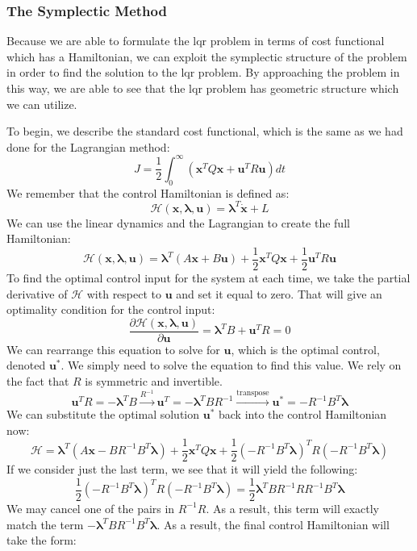 \subsubsection{The Symplectic Method}
Because we are able to formulate the \gls{lqr} problem in terms of cost functional which has a \gls{Hamiltonian}, we can exploit the symplectic structure of the problem in order to find the solution to the \gls{lqr} problem. By approaching the problem in this way, we are able to see that the \gls{lqr} problem has geometric structure which we can utilize. 

To begin, we describe the standard cost functional, which is the same as we had done for the \gls{Lagrangian} method:
$$J=\frac{1}{2}\int_{0}^\infty(\bm{x}^TQ\bm{x}+\bm{u}^TR\bm{u})dt$$
We remember that the control \gls{Hamiltonian} is defined as:
$$\mathcal{H}(\bm{x},\bm{\lambda},\bm{u})=\bm{\lambda}^T\bm{\dot{x}}+L$$
We can use the linear dynamics and the \gls{Lagrangian} to create the full \gls{Hamiltonian}:
$$\mathcal{H}(\bm{x},\bm{\lambda},\bm{u})=\bm{\lambda}^T(A\bm{x}+B\bm{u})+\frac{1}{2}\bm{x}^TQ\bm{x}+\frac{1}{2}\bm{u}^TR\bm{u}$$
To find the optimal control input for the system at each time, we take the partial derivative of $\mathcal{H}$ with respect to $\bm{u}$ and set it equal to zero. That will give an optimality condition for the control input:
$$\frac{\partial \mathcal{H}(\bm{x},\bm{\lambda},\bm{u})}{\partial \bm{u}}=\bm{\lambda}^TB+\bm{u}^TR=0$$
We can rearrange this equation to solve for $\bm{u}$, which is the optimal control, denoted $\bm{u}^*$. We simply need to solve the equation to find this value. We rely on the fact that $R$ is symmetric and invertible.
$$\bm{u}^TR=-\bm{\lambda}^TB\xrightarrow{R^{-1}}\bm{u}^T=-\bm{\lambda}^TBR^{-1}\xrightarrow{\text{transpose}}\bm{u}^*=-R^{-1}B^T\bm{\lambda}$$
We can substitute the optimal solution $\bm{u}^*$ back into the control \gls{Hamiltonian} now:
$$\mathcal{H}=\bm{\lambda}^T(A\bm{x}-BR^{-1}B^T\bm{\lambda})+\frac{1}{2}\bm{x}^TQ\bm{x}+\frac{1}{2}(-R^{-1}B^T\bm{\lambda})^TR(-R^{-1}B^T\bm{\lambda})$$
If we consider just the last term, we see that it will yield the following:
$$\frac{1}{2}(-R^{-1}B^T\bm{\lambda})^TR(-R^{-1}B^T\bm{\lambda})=\frac{1}{2}\bm{\lambda}^TBR^{-1}RR^{-1}B^T\bm{\lambda}$$
We may cancel one of the pairs in $R^{-1}R$. As a result, this term will exactly match the term $-\bm{\lambda}^TBR^{-1}B^T\bm{\lambda}$. As a result, the final control \gls{Hamiltonian} will take the form:
